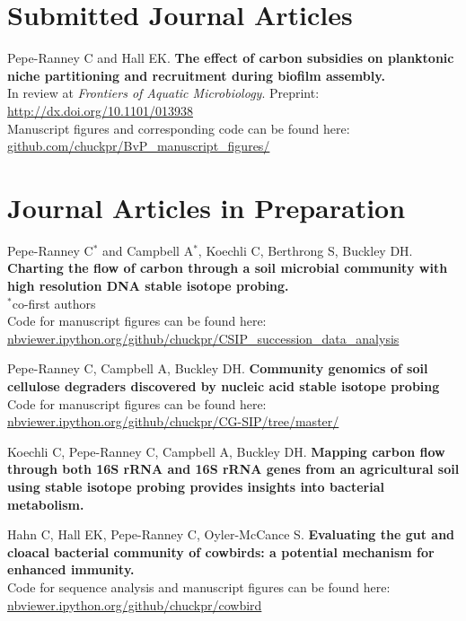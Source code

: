\documentclass[letterpaper]{article}
\renewenvironment{itemize}{
  \begin{list}{}{
    \setlength{\leftmargin}{1.5em}
  }
}{
  \end{list}
}
\begin{document}
\section*{Submitted Journal Articles}
\begin{itemize}
    \item Pepe-Ranney C and Hall EK. \textbf{The effect of carbon subsidies on
        planktonic niche partitioning and recruitment during biofilm
        assembly.}\\
        In review at \textit{Frontiers of Aquatic Microbiology}. Preprint: \\
        \href{http://dx.doi.org/10.1101/013938}
        {http://dx.doi.org/10.1101/013938}\\
        Manuscript figures and corresponding code can be found here: \\
        \href{http://www.github.com/chuckpr/BvP_manuscript_figures/}
        {github.com/chuckpr/BvP\_manuscript\_figures/}
\end{itemize}
\section*{Journal Articles in Preparation}
\begin{itemize}
    \item Pepe-Ranney C$^{*}$ and Campbell A$^{*}$, Koechli C, Berthrong S, 
        Buckley DH. \textbf{Charting the flow of carbon through a soil
            microbial community with high resolution DNA stable isotope
            probing.}\\
        {\small$^{*}$co-first authors}\\
        Code for manuscript figures can be found here:\\
        \href{http://nbviewer.ipython.org/github/chuckpr/CSIP_succession_data_analysis}
        {nbviewer.ipython.org/github/chuckpr/CSIP\_succession\_data\_analysis}
    \item Pepe-Ranney C, Campbell A, Buckley DH. 
        \textbf{Community genomics of soil cellulose degraders discovered by nucleic acid stable isotope probing}\\
        Code for manuscript figures can be found here:\\
        \href{http://nbviewer.ipython.org/github/chuckpr/CG-SIP}
        {nbviewer.ipython.org/github/chuckpr/CG-SIP/tree/master/}
    \item Koechli C, Pepe-Ranney C, Campbell A, Buckley DH. \textbf{Mapping
        carbon flow through both 16S rRNA and 16S rRNA genes from an
        agricultural soil using stable isotope probing provides
        insights into bacterial metabolism.}
    \item Hahn C, Hall EK, Pepe-Ranney C, Oyler-McCance S.
        \textbf{Evaluating the gut and cloacal bacterial community of
        cowbirds: a potential mechanism for enhanced immunity.}\\
        Code for sequence analysis and manuscript figures can be found here:\\
        \href{http://nbviewer.ipython.org/github/chuckpr/cowbird}
        {nbviewer.ipython.org/github/chuckpr/cowbird}
\end{itemize}
\end{document}
